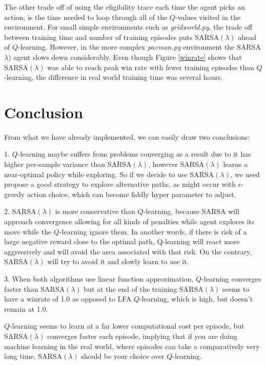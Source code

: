 \documentclass[10pt,conference]{IEEEtran}
\begin{document}
	The other trade off of using the eligibility trace each time the agent 
	picks an action, is the time needed to loop through all of the \(Q\)-values
	visited in the environment. For small simple environments such as \textit{gridworld.py},
	the trade off between training time and number of training episodes puts 
	SARSA\((\lambda)\) ahead of \(Q\)-learning. However, in the more complex 
	\textit{pacman.py} environment the SARSA\(\lambda)\) agent slows down 
	considerably. Even though Figure \ref{winrate} shows that SARSA\((\lambda)\) 
	was able to reach peak win rate with fewer training episodes than \(Q\)-learning,
	the difference in real world training time was several hours.

\section{Conclusion}
From what we have already implemented, we can easily draw two conclusions:

1. \(Q\)-learning maybe suffers from problems converging as a result due to it has higher per-sample variance than SARSA\((\lambda)\), however SARSA\((\lambda)\) learns a near-optimal policy while exploring. So if we decide to use SARSA\((\lambda)\), we need propose a good strategy to explore alternative paths, as might occur with \(\epsilon\)-greedy action choice, which can become fiddly hyper parameter to adjust.

2. SARSA\((\lambda)\) is more conservative than \(Q\)-learning, because SARSA will approach convergence allowing for all kinds of penalties while agent explores its move while the \(Q\)-learning ignore them. In another words, if there is risk of a large negative reward close to the optimal path, Q-learning will react more aggressively and will avoid the area associated with that risk. On the contrary, SARSA\((\lambda)\) will try to avoid it and slowly learn to use it.

3. When both algorithms use linear function approximation, \(Q\)-learning converges faster than SARSA\((\lambda)\) but at the end of the training SARSA\((\lambda)\) seems to have a winrate of 1.0 as opposed to LFA \(Q\)-learning, which is high, but doesn't remain at 1.0.

\(Q\)-learning seems to learn at a far lower computational cost per episode, but SARSA\((\lambda)\) converges faster each episode, implying that if you are doing machine learning in the real world, 
where episodes can take a comparatively very long time, SARSA\((\lambda)\) should be your choice over \(Q\)-learning.
\end{document}
